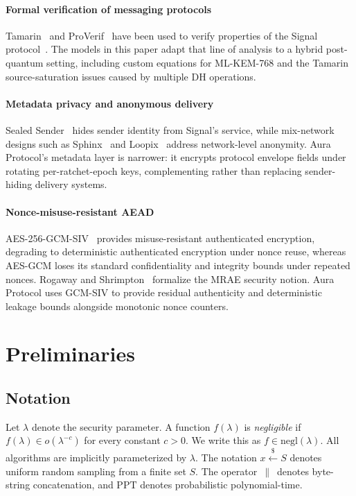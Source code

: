\documentclass[preprint,12pt]{elsarticle}
\theoremstyle{definition}
\newcommand{\secpar}{\lambda}
\newcommand{\negl}{\mathrm{negl}}
\newcommand{\ppt}{\mathrm{PPT}}
\newcommand{\concat}{\,\|\,}
\newcommand{\getsr}{\stackrel{\$}{\gets}}
\begin{document}
\paragraph{Formal verification of messaging protocols}
Tamarin~\cite{meier2013} and ProVerif~\cite{blanchet2016} have been used to verify properties of the Signal protocol~\cite{cohn-gordon2020}. The models in this paper adapt that line of analysis to a hybrid post-quantum setting, including custom equations for ML-KEM-768 and the Tamarin source-saturation issues caused by multiple DH operations.

\paragraph{Metadata privacy and anonymous delivery}
Sealed Sender~\cite{sealed-sender} hides sender identity from Signal's service, while mix-network designs such as Sphinx~\cite{sphinx} and Loopix~\cite{loopix} address network-level anonymity. Aura Protocol's metadata layer is narrower: it encrypts protocol envelope fields under rotating per-ratchet-epoch keys, complementing rather than replacing sender-hiding delivery systems.

\paragraph{Nonce-misuse-resistant AEAD}
AES-256-GCM-SIV~\cite{rfc8452} provides misuse-resistant authenticated encryption, degrading to deterministic authenticated encryption under nonce reuse, whereas AES-GCM loses its standard confidentiality and integrity bounds under repeated nonces. Rogaway and Shrimpton~\cite{rogaway2006} formalize the MRAE security notion. Aura Protocol uses GCM-SIV to provide residual authenticity and deterministic leakage bounds alongside monotonic nonce counters.


\section{Preliminaries}\label{sec:prelim}

\subsection{Notation}

Let $\secpar$ denote the security parameter. A function $f(\secpar)$ is \emph{negligible} if $f(\secpar) \in o(\secpar^{-c})$ for every constant $c > 0$. We write this as $f \in \negl(\secpar)$. All algorithms are implicitly parameterized by $\secpar$. The notation $x \getsr S$ denotes uniform random sampling from a finite set $S$. The operator $\concat$ denotes byte-string concatenation, and $\ppt$ denotes probabilistic polynomial-time.
\end{document}
